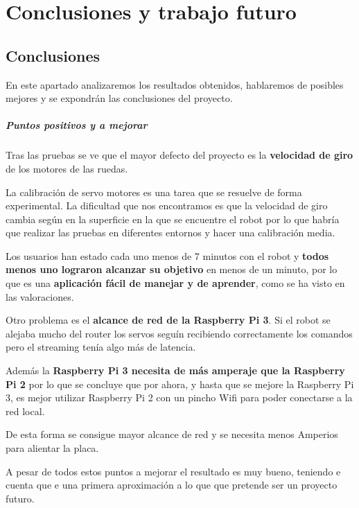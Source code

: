 \documentclass[twoside, 12pt]{epstfg}
\begin{document}
\chapter{Conclusiones y trabajo futuro}
\label{chap:conclusiones}
\vspace{-0.2cm}

\section{Conclusiones}
En este apartado analizaremos los resultados obtenidos, hablaremos de posibles mejores y se expondrán las conclusiones del proyecto.

\paragraph{Puntos positivos y a mejorar}

Tras las pruebas se ve que el mayor defecto del proyecto es la \textbf{velocidad de giro} de los motores de las ruedas.

La calibración de servo motores es una tarea que se resuelve de forma experimental. La dificultad que nos encontramos es que la velocidad de giro cambia según en la superficie en la que se encuentre el robot por lo que habría que realizar las pruebas en diferentes entornos y hacer una calibración media.

Los usuarios han estado cada uno menos de 7 minutos con el robot y \textbf{todos menos uno lograron alcanzar su objetivo} en menos de un minuto, por lo que es una \textbf{aplicación fácil de manejar y de aprender}, como se ha visto en las valoraciones.

Otro problema es el \textbf{alcance de red de la Raspberry Pi 3}. Si el robot se alejaba mucho del router los servos seguín recibiendo correctamente los comandos pero el streaming tenía algo más de latencia.

Además la \textbf{Raspberry Pi 3 necesita de más amperaje que la Raspberry Pi 2} por lo que se concluye que por ahora, y hasta que se mejore la Raspberry Pi 3, es mejor utilizar Raspberry Pi 2 con un pincho Wifi para poder conectarse a la red local.

De esta forma se consigue mayor alcance de red y se necesita menos Amperios para alientar la placa.

A pesar de todos estos puntos a mejorar el resultado es muy bueno, teniendo e cuenta que e una primera aproximación a lo que que pretende ser un proyecto futuro.
\end{document}
